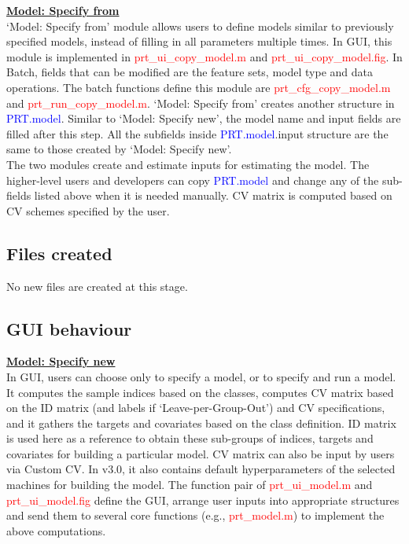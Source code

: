 \noindent \textbf{\underline{Model: Specify from}}
\\

`Model: Specify from' module allows users to define models similar to previously specified models,  instead of filling in all parameters multiple times. In GUI, this module is implemented in \textcolor{red}{prt\_ui\_copy\_model.m} and \textcolor{red}{prt\_ui\_copy\_model.fig}. In Batch, fields that can be modified are the feature sets, model type and data operations. The batch functions define this module are \textcolor{red}{prt\_cfg\_copy\_model.m} and \textcolor{red}{prt\_run\_copy\_model.m}. `Model: Specify from' creates another structure in \textcolor{blue}{PRT.model}. Similar to `Model: Specify new', the model name and input fields are filled after this step. All the subfields inside \textcolor{blue}{PRT.model}.input structure are the same to those created by `Model: Specify new'.
\\

The two modules create and estimate inputs for estimating the model. The higher-level users and developers can copy \textcolor{blue}{PRT.model} and change any of the sub-fields listed above when it is needed manually. CV matrix is computed based on CV schemes specified by the user.


\subsection{Files created}

No new files are created at this stage.



\subsection{GUI behaviour}

\textbf{\underline{Model: Specify new}}
\\

In GUI, users can choose only to specify a model, or to specify and run a model. It computes the sample indices based on the classes, computes CV matrix based on the ID matrix (and labels if `Leave-per-Group-Out') and CV specifications, and it gathers the targets and covariates based on the class definition. ID matrix is used here as a reference to obtain these sub-groups of indices, targets and covariates for building a particular model. CV matrix can also be input by users via Custom CV. In v3.0, it also contains default hyperparameters of the selected machines for building the model. The function pair of \textcolor{red}{prt\_ui\_model.m} and \textcolor{red}{prt\_ui\_model.fig} define the GUI, arrange user inputs into appropriate structures and send them to several core functions (e.g., \textcolor{red}{prt\_model.m}) to implement the above computations. \\

